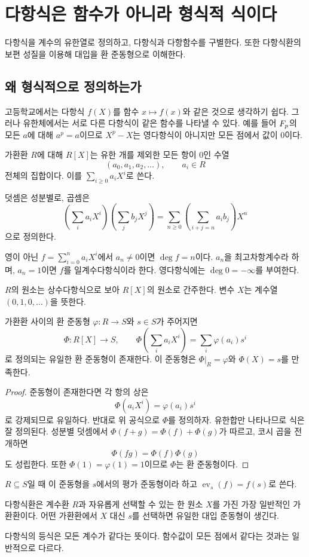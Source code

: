 \section{다항식은 함수가 아니라 형식적 식이다}
\label{sec:formal-polynomials}

\begin{learninggoal}
다항식을 계수의 유한열로 정의하고, 다항식과 다항함수를 구별한다. 또한 다항식환의 보편 성질을 이용해 대입을 환 준동형으로 이해한다.
\end{learninggoal}

\subsection{왜 형식적으로 정의하는가}

고등학교에서는 다항식 $f(X)$를 함수 $x\mapsto f(x)$와 같은 것으로 생각하기 쉽다. 그러나 유한체에서는 서로 다른 다항식이 같은 함수를 나타낼 수 있다. 예를 들어 $F_p$의 모든 $a$에 대해 $a^p=a$이므로 $X^p-X$는 영다항식이 아니지만 모든 점에서 값이 $0$이다.

\begin{definition}
가환환 $R$에 대해 $R[X]$는 유한 개를 제외한 모든 항이 $0$인 수열
\[
  (a_0,a_1,a_2,\dots),\qquad a_i\in R
\]
전체의 집합이다. 이를 $\sum_{i\ge0}a_iX^i$로 쓴다.
\end{definition}

덧셈은 성분별로, 곱셈은
\[
  \left(\sum_i a_iX^i\right)\left(\sum_j b_jX^j\right)
  =\sum_{n\ge0}\left(\sum_{i+j=n}a_ib_j\right)X^n
\]
으로 정의한다.

\begin{definition}
영이 아닌 $f=\sum_{i=0}^n a_iX^i$에서 $a_n\ne0$이면 $\deg f=n$이다. $a_n$을 최고차항계수라 하며, $a_n=1$이면 $f$를 일계수다항식이라 한다. 영다항식에는 $\deg0=-\infty$를 부여한다.
\end{definition}

$R$의 원소는 상수다항식으로 보아 $R[X]$의 원소로 간주한다. 변수 $X$는 계수열 $(0,1,0,\dots)$을 뜻한다.

\begin{theorem}[다항식환의 보편 성질]
가환환 사이의 환 준동형 $\varphi:R\to S$와 $s\in S$가 주어지면
\[
  \Phi:R[X]\to S,\qquad
  \Phi\left(\sum_i a_iX^i\right)=\sum_i\varphi(a_i)s^i
\]
로 정의되는 유일한 환 준동형이 존재한다. 이 준동형은 $\Phi|_R=\varphi$와 $\Phi(X)=s$를 만족한다.
\end{theorem}

\begin{proof}
준동형이 존재한다면 각 항의 상은
\[
  \Phi(a_iX^i)=\varphi(a_i)s^i
\]
로 강제되므로 유일하다. 반대로 위 공식으로 $\Phi$를 정의하자. 유한합만 나타나므로 식은 잘 정의된다. 성분별 덧셈에서 $\Phi(f+g)=\Phi(f)+\Phi(g)$가 따르고, 코시 곱을 전개하면
\[
  \Phi(fg)=\Phi(f)\Phi(g)
\]
도 성립한다. 또한 $\Phi(1)=\varphi(1)=1$이므로 $\Phi$는 환 준동형이다.
\end{proof}

$R\subseteq S$일 때 이 준동형을 $s$에서의 평가 준동형이라 하고 $\operatorname{ev}_s(f)=f(s)$로 쓴다.

\begin{keyidea}
다항식환은 계수환 $R$과 자유롭게 선택할 수 있는 한 원소 $X$를 가진 가장 일반적인 가환환이다. 어떤 가환환에서 $X$ 대신 $s$를 선택하면 유일한 대입 준동형이 생긴다.
\end{keyidea}

\begin{pitfall}
다항식의 등식은 모든 계수가 같다는 뜻이다. 함수값이 모든 점에서 같다는 것과는 일반적으로 다르다.
\end{pitfall}
